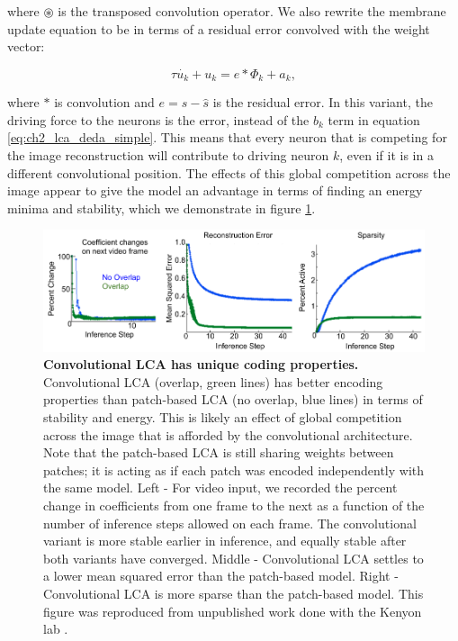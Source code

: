 \noindent where $\circledast$ is the transposed convolution operator. We also rewrite the membrane update equation to be in terms of a residual error convolved with the weight vector:

\begin{equation}\label{eq:ch2_conv_lca_dynamics}
   \tau \dot{u_{k}} + u_{k} = e \ast \Phi_{k} + a_{k},
\end{equation}

\noindent where $\ast$ is convolution and $e = s - \hat{s}$ is the residual error. In this variant, the driving force to the neurons is the error, instead of the $b_{k}$ term in equation \ref{eq:ch2_lca_deda_simple}. This means that every neuron that is competing for the image reconstruction will contribute to driving neuron $k$, even if it is in a different convolutional position. The effects of this global competition across the image appear to give the model an advantage in terms of finding an energy minima and stability, which we demonstrate in figure \ref{fig:ch2_lca_conv_benefit}.

\begin{figure}[h]\label{fig:ch2_lca_conv_benefit}
    \centering
    \includegraphics[width=\textwidth]{figures/lca_conv_benefits.png}
    \caption{\textbf{Convolutional LCA has unique coding properties.} Convolutional LCA (overlap, green lines) has better encoding properties than patch-based LCA (no overlap, blue lines) in terms of stability and energy. This is likely an effect of global competition across the image that is afforded by the convolutional architecture. Note that the patch-based LCA is still sharing weights between patches; it is acting as if each patch was encoded independently with the same model. Left - For video input, we recorded the percent change in coefficients from one frame to the next as a function of the number of inference steps allowed on each frame. The convolutional variant is more stable earlier in inference, and equally stable after both variants have converged. Middle - Convolutional LCA settles to a lower mean squared error than the patch-based model. Right - Convolutional LCA is more sparse than the patch-based model. This figure was reproduced from unpublished work done with the Kenyon lab \parencite{paiton2013deep}.}
\end{figure}



